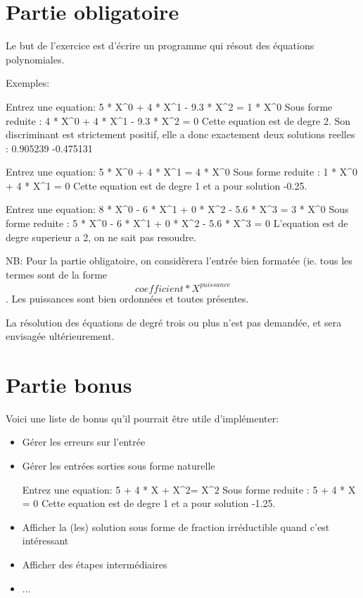 \documentclass{42}
\begin{document}
\chapter{Partie obligatoire}


\makeheaderbasic

Le but de l'exercice est d'écrire un programme qui résout des équations polynomiales.

Exemples:

\begin{42console}
Entrez une equation: 5 * X^0 + 4 * X^1 - 9.3 * X^2 = 1 * X^0
Sous forme reduite : 4 * X^0 + 4 * X^1 - 9.3 * X^2 = 0
Cette equation est de degre 2.
Son discriminant est strictement positif, elle a donc exactement deux solutions reelles :
0.905239
-0.475131
\end{42console}

\begin{42console}
Entrez une equation: 5 * X^0 + 4 * X^1 = 4 * X^0
Sous forme reduite : 1 * X^0 + 4 * X^1 = 0
Cette equation est de degre 1 et a pour solution -0.25.
\end{42console}

\begin{42console}
Entrez une equation: 8 * X^0 - 6 * X^1 + 0 * X^2 - 5.6 * X^3 = 3 * X^0
Sous forme reduite : 5 * X^0 - 6 * X^1 + 0 * X^2 - 5.6 * X^3 = 0
L'equation est de degre superieur a 2, on ne sait pas resoudre.
\end{42console}

NB: Pour la partie obligatoire, on considèrera l'entrée bien formatée (ie. tous les termes sont de la forme \begin{equation}coefficient * X^{puissance}\end{equation}. Les puissances sont bien ordonnées et toutes présentes.

\info
{
	La résolution des équations de degré trois ou plus n'est pas demandée, et sera envisagée ultérieurement.
}

\newpage

\chapter{Partie bonus}

Voici une liste de bonus qu'il pourrait être utile d'implémenter:



\begin{itemize}
	\item Gérer les erreurs sur l'entrée
	\item Gérer les entrées sorties sous forme naturelle
\begin{42console}
Entrez une equation: 5 + 4 * X + X^2= X^2
Sous forme reduite : 5 + 4 * X = 0
Cette equation est de degre 1 et a pour solution -1.25.
\end{42console}
	\item Afficher la (les) solution sous forme de fraction irréductible quand c'est intéressant
	\item Afficher des étapes intermédiaires
	\item ...
\end{itemize}
\end{document}
